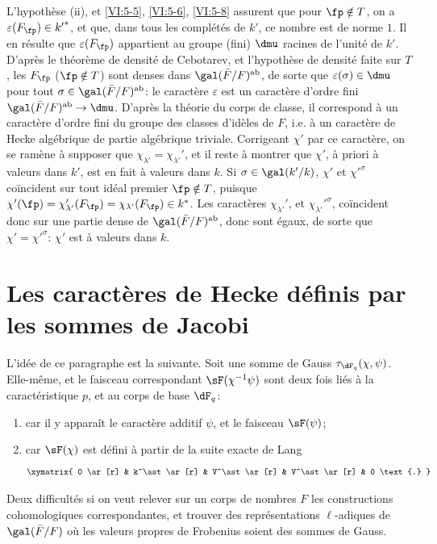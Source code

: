L'hypothèse (ii), et \ref{VI:5-5}, \ref{VI:5-6}, \ref{VI:5-8} assurent que 
pour $\fp\notin T$, on a $\varepsilon(F_\fp)\in {k'}^\ast$, et que, dans tous 
les complétés de $k'$, ce nombre est de norme $1$. Il en résulte que 
$\varepsilon(F_\fp)$ appartient au groupe (fini) $\dmu$ racines de l'unité 
de $k'$. D'après le théorème de densité de Cebotarev, et l'hypothèse 
de densité faite sur $T$, les $F_\fp$ ($\fp\notin T$) sont denses dans 
$\gal(\bar F/F)^\text{ab}$, de sorte que $\varepsilon(\sigma)\in \dmu$ pour tout 
$\sigma\in \gal(\bar F/F)^\text{ab}$: le caractère $\varepsilon$ est un 
caractère d'ordre fini $\gal(\bar F/F)^\text{ab}\to \dmu$. D'après la 
théorie du corps de classe, il correspond à un caractère d'ordre fini 
du groupe des classes d'idèles de $F$, i.e. à un caractère de Hecke 
algébrique de partie algébrique triviale. Corrigeant $\chi'$ par ce 
caractère, on se ramène à supposer que 
$\chi_{\lambda'}=\chi_{\lambda'}'$,  et il reste à montrer que $\chi'$, à 
priori à valeurs dans $k'$, est en fait à valeurs dans $k$. Si 
$\sigma\in \gal(k'/k)$, $\chi'$ et ${\chi'}^\sigma$ coïncident sur tout idéal 
premier $\fp\notin T$, puisque 
$\chi'(\fp) = \chi'_{\lambda'}(F_\fp) = \chi_{\lambda'}(F_\fp) \in k^\ast$. 
Les caractères $\chi_{\lambda'}'$, et ${\chi_{\lambda'}'}^\sigma$, coïncident 
donc sur une partie dense de $\gal(\bar F/F)^\text{ab}$, donc sont égaux, de 
sorte que $\chi'={\chi'}^\sigma$: $\chi'$ est à valeurs dans $k$. 










\section{Les caractères de Hecke définis par les sommes de Jacobi}\label{VI:6}

L'idée de ce paragraphe est la suivante. Soit une somme de Gauss 
$\tau_{\dF_q}(\chi,\psi)$. Elle-même, et le faisceau correspondant 
$\sF(\chi^{-1}\psi)$ sont deux fois liés à la caractéristique $p$, et au 
corps de base $\dF_q$: 
\begin{enumerate}[\indent a)]
  \item car il y appara\^it le caractère additif $\psi$, et le faisceau 
    $\sF(\psi)$; 
  \item car $\sF(\chi)$ est défini à partir de la suite exacte de Lang 
    \[\xymatrix{
      0 \ar[r] 
        & k^\ast \ar[r] 
        & V^\ast \ar[r] 
        & V^\ast \ar[r] 
        & 0 \text{.} 
    }\]
\end{enumerate}
Deux difficultés si on veut relever sur un corps de nombres $F$ les 
constructions cohomologiques correspondantes, et trouver des 
représentations $\ell$-adiques de $\gal(\bar F/F)$ où les valeurs propres 
de Frobenius soient des sommes de Gauss. 

